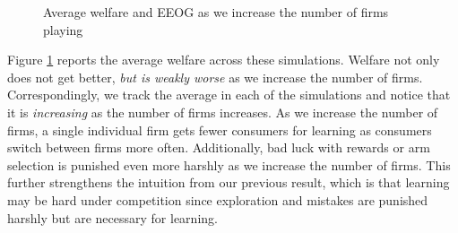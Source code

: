 \documentclass[../competing_bandits_with_appendix.tex]{subfiles}
\begin{document}
{\begin{figure}
\caption{Average welfare and EEOG as we increase the number of firms playing \DG}
\label{many_firm_welfare}
\end{figure}

 Figure \ref{many_firm_welfare} reports the average welfare
across these simulations. Welfare not only does not get better,
\textit{but is weakly worse} as we increase the number of
firms. Correspondingly, we track the average \Eeog in each of the
simulations and notice that it is \textit{increasing} as the number of
firms increases. As we increase the number of firms, a single
individual firm gets fewer consumers for learning as consumers switch
between firms more often. Additionally, bad luck with rewards or arm
selection is punished even more harshly as we increase the number of
firms. This further strengthens the intuition from our previous
result, which is that learning may be hard under competition since
exploration and mistakes are punished harshly but are necessary for
learning.}
\end{document}
